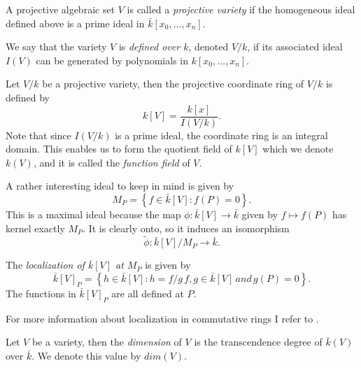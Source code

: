 \begin{mydef}
 A projective algebraic set $V$ is called a \emph{projective variety} if the homogeneous
ideal defined above is a prime ideal in $\bar{k}[x_0,\ldots,x_n]$.
\end{mydef}

We say that the variety $V$ is \emph{defined over $k$}, denoted $V/k$, if its associated ideal $I(V)$
can be generated by polynomials in $k[x_0,\ldots,x_n]$.

\begin{mydef}
 Let $V/k$ be a projective variety, then the projective coordinate ring of $V/k$ is defined by
$$ k[V] = \frac{k[x]}{I(V/k)}.$$
Note that since $I(V/k)$ is a prime ideal, the coordinate ring is an integral domain.
This enables us to form the quotient field of $k[V]$ which we denote $k(V)$, and it is called
the \emph{function field} of $V$.
\end{mydef}

A rather interesting ideal to keep in mind is given by
$$ M_P = \left\{ f\in \bar{k}[V] : f(P)=0 \right\}. $$
This is a maximal ideal because the map $\phi: \bar{k}[V] \rightarrow \bar{k}$ given by
$ f \mapsto f(P) $ has kernel exactly $M_P$. It is clearly onto, so it induces an
isomorphism $$\tilde{\phi}: \bar{k}[V]/M_P \rightarrow \bar{k}. $$

\begin{mydef}
 The \emph{localization of $\bar{k}[V]$ at $M_P$} is given by
$$ \bar{k}[V]_P = \left\{ h \in \bar{k}[V] : h = f/g\, f,g\in \bar{k}[V]\, and\, g(P)=0 \right\}. $$
The functions in $\bar{k}[V]_P$ are all defined at $P$.
\end{mydef}

For more information about localization in commutative rings I refer to \cite{Hideyuki}.


\begin{mydef}
 Let $V$ be a variety, then the \emph{dimension} of $V$ is the transcendence degree of $\bar{k}(V)$ over
$\bar{k}$. We denote this value by $dim(V)$.
\end{mydef}

